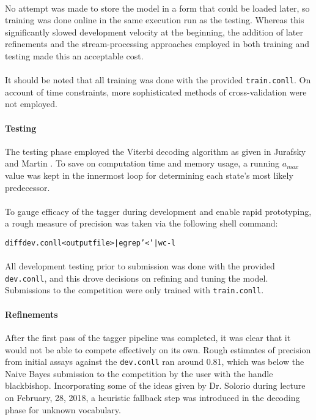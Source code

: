 \documentclass[11pt,a4paper]{article}
\begin{document}
\paragraph{}
No attempt was made to store the model in a form that could be loaded later,
so training was done online in the same execution run as the testing.
Whereas this significantly slowed development velocity at the beginning,
the addition of later refinements and the stream-processing approaches
employed in both training and testing made this an acceptable cost.

\paragraph{}
It should be noted that all training was done with the provided \texttt{train.conll}.
On account of time constraints, more sophisticated methods of cross-validation
were not employed.

\paragraph{Testing}
The testing phase employed the Viterbi decoding algorithm as given in Jurafsky and
Martin . To save on computation time and memory usage,
a running $a_{max}$ value was kept in the innermost loop for determining each
state's most likely predecessor.

\paragraph{}
To gauge efficacy of the tagger during development and enable rapid prototyping,
a rough measure of precision was taken via the following shell command:

\begin{alltt}
  \tiny{diff dev.conll <output file> | egrep '<' | wc -l}
\end{alltt}

\paragraph{}
All development testing prior to submission was done with the provided
\texttt{dev.conll}, and this drove decisions on refining and tuning the model.
Submissions to the competition were only trained with \texttt{train.conll}.

\paragraph{Refinements}
After the first pass of the tagger pipeline was completed, it was clear that it would
not be able to compete effectively on its own. Rough estimates of precision from
initial assays against the \texttt{dev.conll} ran around 0.81, which was below the
Naive Bayes submission to the competition by the user with the handle blackbishop.
Incorporating some of the ideas given by Dr. Solorio during lecture on February, 28, 2018,
a heuristic fallback step was introduced in the decoding phase for unknown vocabulary.
\end{document}
